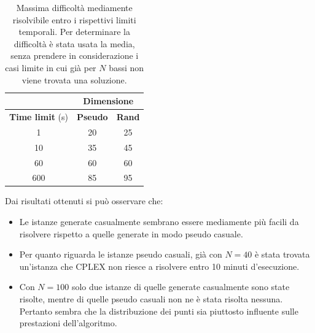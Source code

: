 \begin{table}[htbp]
	\centering
	\begin{tabular}{c|c|c|}
		\cline{2-3}
		& \multicolumn{2}{c|}{\textbf{Dimensione}} \\ \hline
		\multicolumn{1}{|c|}{\textbf{Time limit} (s)} & \textbf{Pseudo}      & \textbf{Rand}     \\ \hline
		\multicolumn{1}{|c|}{1}                   & 20                   & 25                \\ \hline
		\multicolumn{1}{|c|}{10}                  & 35                   & 45                \\ \hline
		\multicolumn{1}{|c|}{60}                  & 60                   & 60                \\ \hline
		\multicolumn{1}{|c|}{600}                 & 85                   & 95               \\ \hline
	\end{tabular}
	\caption{Massima difficoltà mediamente risolvibile entro i rispettivi limiti temporali. Per determinare la difficoltà è stata usata la media, senza prendere in considerazione i casi limite in cui già per $N$ bassi non viene trovata una soluzione.}
	\label{tab:cplex-recap}
\end{table}

Dai risultati ottenuti si può osservare che:

\begin{itemize}
	\item Le istanze generate casualmente sembrano essere mediamente più facili da risolvere rispetto a quelle generate in modo pseudo casuale.
	\item Per quanto riguarda le istanze pseudo casuali, già con $N=40$ è stata trovata un'istanza che CPLEX non riesce a risolvere entro 10 minuti d'esecuzione.
	\item Con $N = 100$ solo due istanze di quelle generate casualmente sono state risolte, mentre di quelle pseudo casuali non ne è stata risolta nessuna. 
	Pertanto sembra che la distribuzione dei punti sia piuttosto influente sulle prestazioni dell'algoritmo.
\end{itemize}
